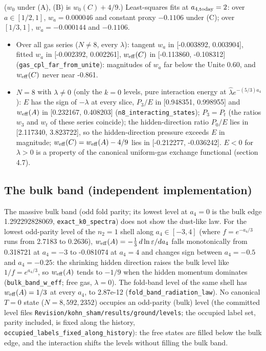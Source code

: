\documentclass[11pt]{article}
\begin{document}
($w_0$ under (A), (B) is $w_0(C) + 4/9$.) Least-squares fits at $a_{4,\rm today} = 2$: over $a \in [1/2, 1]$, $w_a = 0.000046$ and constant proxy $-0.1106$ under (C); over $[1/3, 1]$, $w_a = -0.000144$ and $-0.1106$.

\begin{itemize}
\item Over all gas series ($N \neq 8$, every $\lambda$): tangent $w_a$ in [-0.003892, 0.003904], fitted $w_a$ in [-0.002392, 0.002261], $w_{\rm eff}(C)$ in [-0.113860, -0.108312] (\texttt{gas\_cpl\_\allowbreak{}far\_from\allowbreak{}\_unite}): magnitudes of $w_a$ far below the Unite 0.60, and $w_{\rm eff}(C)$ never near -0.861.
\item $N = 8$ with $\lambda \neq 0$ (only the $k = 0$ levels, pure interaction energy at $\hat\lambda e^{-(5/3)a_4}$): $E$ has the sign of $-\lambda$ at every slice, $P_3/E$ in [0.948351, 0.998955] and $w_{\rm eff}(A)$ in [0.232167, 0.408203] (\texttt{n8\_inter\allowbreak{}acting\_s\allowbreak{}tates}); $P_3 = P_t$ (the ratios $w_3$ and $w_t$ of these series coincide); the hidden-direction ratio $P_0/E$ lies in [2.117340, 3.823722], so the hidden-direction pressure exceeds $E$ in magnitude; $w_{\rm eff}(C) = w_{\rm eff}(A) - 4/9$ lies in [-0.212277, -0.036242]. $E < 0$ for $\lambda > 0$ is a property of the canonical uniform-gas exchange functional (section 4.7).
\end{itemize}

\subsection{The bulk band (independent implementation)}

The massive bulk band (odd fold parity; its lowest level at $a_4 = 0$ is the bulk edge 1.292292828069, \texttt{exact\_k0\allowbreak{}\_spectra}) does not show the dust-like law. For the lowest odd-parity level of the $n_2 = 1$ shell along $a_4 \in [-3, 4]$ (where $f = e^{-a_4/3}$ runs from 2.7183 to 0.2636), $w_{\rm eff}(A) = -\frac13\,d\ln\varepsilon/da_4$ falls monotonically from 0.318721 at $a_4 = -3$ to -0.081074 at $a_4 = 4$ and changes sign between $a_4 = -0.5$ and $a_4 = -0.25$: the shrinking hidden direction raises the bulk level like $1/f = e^{a_4/3}$, so $w_{\rm eff}(A)$ tends to $-1/9$ when the hidden momentum dominates (\texttt{bulk\_ban\allowbreak{}d\_w\_eff}; free gas, $\lambda = 0$). The fold-band level of the same shell has $w_{\rm eff}(A) = 1/3$ at every $a_4$, to 2.87e-12 (\texttt{fold\_ban\allowbreak{}d\_radiat\allowbreak{}ion\_law}). No canonical $T = 0$ state ($N = 8, 592, 2352$) occupies an odd-parity (bulk) level (the committed level files \texttt{Revision\allowbreak{}/kohn\_sh\allowbreak{}am/resul\allowbreak{}ts/groun\allowbreak{}d/levels}; the occupied label set, parity included, is fixed along the history, \texttt{occupied\allowbreak{}\_labels\_\allowbreak{}fixed\_al\allowbreak{}ong\_hist\allowbreak{}ory}): the free states are filled below the bulk edge, and the interaction shifts the levels without filling the bulk band.
\end{document}
